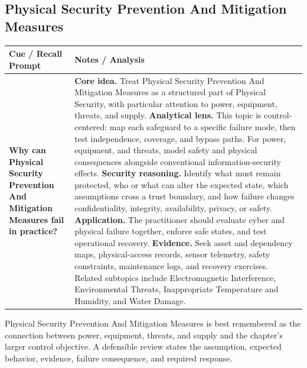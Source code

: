 \documentclass[11pt]{article}
\newcommand{\CornellHeader}{%
\rowcolor{Navy}\color{white}\bfseries Cue / Recall Prompt & \color{white}\bfseries Notes / Analysis\\\hline}
\newcommand{\CornellRow}[2]{%
\cellcolor{CueGray}\RaggedRight\textbf{#1} & \RaggedRight #2\\\hline}
\begin{document}
\subsection*{Physical Security Prevention And Mitigation Measures}
\begin{longtable}{>{\RaggedRight\arraybackslash}p{}|>{\RaggedRight\arraybackslash}p{}}
\CornellHeader
\CornellRow{Why can Physical Security Prevention And Mitigation Measures fail in practice?}{\textbf{Core idea.} Treat Physical Security Prevention And Mitigation Measures as a structured part of Physical Security, with particular attention to power, equipment, threats, and supply. \textbf{Analytical lens.} This topic is control-centered: map each safeguard to a specific failure mode, then test independence, coverage, and bypass paths. For power, equipment, and threats, model safety and physical consequences alongside conventional information-security effects. \textbf{Security reasoning.} Identify what must remain protected, who or what can alter the expected state, which assumptions cross a trust boundary, and how failure changes confidentiality, integrity, availability, privacy, or safety. \textbf{Application.} The practitioner should evaluate cyber and physical failure together, enforce safe states, and test operational recovery. \textbf{Evidence.} Seek asset and dependency maps, physical-access records, sensor telemetry, safety constraints, maintenance logs, and recovery exercises. Related subtopics include Electromagnetic Interference, Environmental Threats, Inappropriate Temperature and Humidity, and Water Damage.}
\end{longtable}
\begin{topicsummary}
Physical Security Prevention And Mitigation Measures is best remembered as the connection between power, equipment, threats, and supply and the chapter's larger control objective. A defensible review states the assumption, expected behavior, evidence, failure consequence, and required response.
\end{topicsummary}
\end{document}
